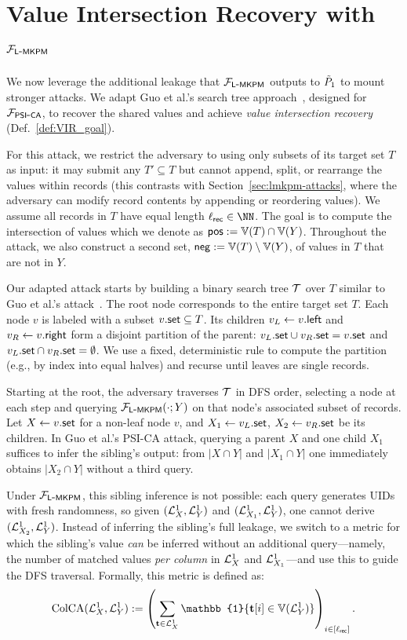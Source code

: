 \section{Value Intersection Recovery with $\mathcal{F}_{\mathsf{L\mbox{-}MKPM}}$}\label{sec:st-mkpm-attack}

We now leverage the additional leakage that $\mathcal{F}_{\mathsf{L\mbox{-}MKPM}}$ outputs to $\tilde{P}_1$ to mount stronger attacks. We adapt Guo et al.'s search tree approach~\cite{USENIX:GHLWJL22}, designed for $\mathcal{F}_{\mathsf{PSI\mbox{-}CA}}$, to recover the shared values and achieve \emph{value intersection recovery} (Def.~\ref{def:VIR_goal}). 

For this attack, we restrict the adversary to using only subsets of its target set $T$ as input: it may submit any $T' \subseteq T$ but cannot append, split, or rearrange the values within records (this contrasts with Section~\ref{sec:lmkpm-attacks}, where the adversary can modify record contents by appending or reordering values). 
We assume all records in $T$ have equal length $\ell_{\rec} \in \NN$. 
The goal is to compute the intersection of values which we denote as $\posSet := \Ispace[T] \cap \Ispace[Y]$. Throughout the attack, we also construct a second set, $\negSet := \Ispace[T] \setminus \Ispace[Y]$, of values in $T$ that are not in $Y$. 

Our adapted attack starts by building a binary search tree $\mathcal{T}$ over $T$ similar to Guo et al.'s attack~\cite{USENIX:GHLWJL22}. The root node corresponds to the entire target set $T$. Each node $v$ is labeled with a subset $v.\mathsf{set} \subseteq T$. Its children $v_L \gets v.\mathsf{left}$ and $v_R \gets v.\mathsf{right}$ form a disjoint partition of the parent:
$v_L.\mathsf{set} \cup v_R.\mathsf{set} = v.\mathsf{set}$ and $v_L.\mathsf{set} \cap v_R.\mathsf{set} = \emptyset$.
We use a fixed, deterministic rule to compute the partition (e.g., by index into equal halves) and recurse until leaves are single records. 

Starting at the root, the adversary traverses $\mathcal{T}$ in DFS order, selecting a node at each step and querying $\mathcal{F}_{\mathsf{L\mbox{-}MKPM}}(\cdot; Y)$ on that node’s associated subset of records. Let $X \gets v.\mathsf{set}$ for a non-leaf node $v$, and $X_1 \gets v_L.\mathsf{set}$, $X_2 \gets v_R.\mathsf{set}$ be its children. In Guo et al.'s PSI-CA attack, querying a parent $X$ and one child $X_1$ suffices to infer the sibling’s output: from $|X \cap Y|$ and $|X_1 \cap Y|$ one immediately obtains $|X_2 \cap Y|$ without a third query.

Under $\mathcal{F}_{\mathsf{L\mbox{-}MKPM}}$, this sibling inference is not possible: each query
generates UIDs with fresh randomness, so given $({\mathcal{L}^1_{X_{}}}, {\mathcal{L}^1_{Y}})$ and
$({\mathcal{L}^1_{X_{1}}}, {\mathcal{L}^1_{Y}})$, one cannot derive $({\mathcal{L}^1_{X_{2}}}, {\mathcal{L}^1_{Y}})$. Instead of
inferring the sibling’s full leakage, we switch to a metric for which the
sibling’s value \emph{can} be inferred without an additional query---namely, the
number of matched values \emph{per column} in ${\mathcal{L}^1_{X_{}}}$ and ${\mathcal{L}^1_{X_{1}}}$---and
use this to guide the DFS traversal. Formally, this metric is defined as:
\begin{equation*}
  \text{ColCA}(\leakX{}, \leakY) :=
  \left(\sum_{\bt\in\leakX{}}\mathbb{1}\{\bt[i] \in
    \Ispace[\leakY]\}\right)_{i\in[\ell_{\rec}]}.
\end{equation*}

